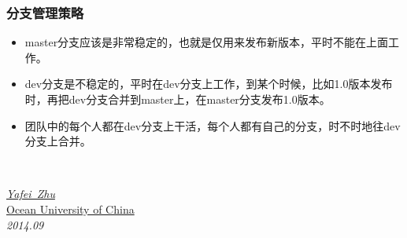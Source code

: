 \documentclass[notheorems,mathserif,table,compress]{beamer}  %
\newcommand\zhushadow[2][purple]{\hskip5pt\shadowbox{\color{#1}\small\kai #2\vspace{3mm}}}
\begin{document}
\begin{frame}
  \frametitle{分支管理策略}
  \begin{itemize}
  \item master分支应该是非常稳定的，也就是仅用来发布新版本，平时不能在上面工作。
  \item dev分支是不稳定的，平时在dev分支上工作，到某个时候，比如1.0版本发布时，再把dev分支合并到master上，在master分支发布1.0版本。
  \item 团队中的每个人都在dev分支上干活，每个人都有自己的分支，时不时地往dev分支上合并。
  \end{itemize}
\end{frame}


\begin{frame}
  \vspace{2cm}
  \centering
  \zhushadow{\color{blue}\Huge{Thanks}}\\
  \vspace{1.5cm}
  \begin{flushright}
  \emph{\href{mailto:bingzh@ouc.edu.cn}{Yafei~Zhu}}\\
  \href{http://www.ouc.edu.cn}{Ocean University of China}\\
  \emph{2014.09}
  \end{flushright}  
\end{frame}
\end{document}
